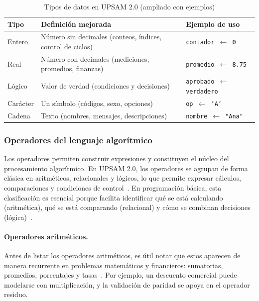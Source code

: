 \documentclass[12pt,twoside]{book}
\begin{document}
						\begin{table}[h]
							\centering
							\caption{Tipos de datos en UPSAM 2.0 (ampliado con ejemplos)}
							\label{tab:upsam_tipos_datos}
							\begin{tabular}{lll}
								\hline
								\textbf{Tipo} & \textbf{Definición mejorada} & \textbf{Ejemplo de uso} \\
								\hline
								Entero & Número sin decimales (conteos, índices, control de ciclos) & \texttt{contador $\leftarrow$ 0} \\
								Real & Número con decimales (mediciones, promedios, finanzas) & \texttt{promedio $\leftarrow$ 8.75} \\
								Lógico & Valor de verdad (condiciones y decisiones) & \texttt{aprobado $\leftarrow$ verdadero} \\
								Carácter & Un símbolo (códigos, sexo, opciones) & \texttt{op $\leftarrow$ 'A'} \\
								Cadena & Texto (nombres, mensajes, descripciones) & \texttt{nombre $\leftarrow$ "Ana"} \\
								\hline
							\end{tabular}
						\end{table}
				
					\subsubsection{Operadores del lenguaje algorítmico}
						\noindent
						Los operadores permiten construir expresiones y constituyen el núcleo del procesamiento algorítmico\cite{Sebesta2018Concepts,Cormen2022Introduction,Farrell2018Programming}. En UPSAM 2.0, los operadores se agrupan de forma clásica en aritméticos, relacionales y lógicos, lo que permite expresar cálculos, comparaciones y condiciones de control~\cite{Joyanes2007Fundamentos}. En programación básica, esta clasificación es esencial porque facilita identificar qué se está calculando (aritmética), qué se está comparando (relacional) y cómo se combinan decisiones (lógica)~\cite{Cormen2022Introduction,Farrell2018Programming,Wentworth2012How}.
							
						\paragraph{Operadores aritméticos.}
							Antes de listar los operadores aritméticos, es útil notar que estos aparecen de manera recurrente en problemas matemáticos y financieros: sumatorias, promedios, porcentajes y tasas~\cite{Gaddis2022Starting,Cormen2022Introduction,Farrell2018Programming,Miller2011Problem}. Por ejemplo, un descuento comercial puede modelarse con multiplicación, y la validación de paridad se apoya en el operador residuo.
							
\end{document}
